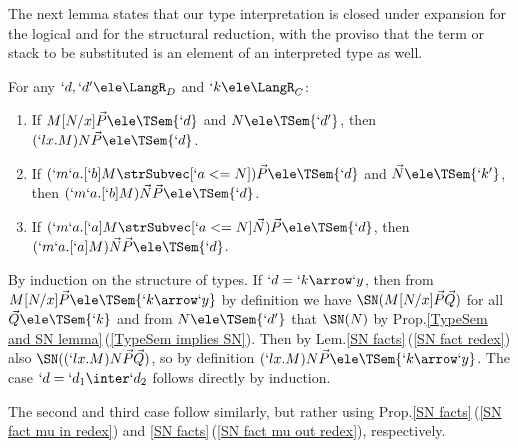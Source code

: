 \documentclass{lmcs}
\newcommand{\vect}[1]{\vec{#1}}
\begin{document}
The next lemma states that our type interpretation is closed under expansion for the logical and for the structural reduction, with the proviso that the term or stack to be substituted is an element of an interpreted type as well.

 \begin{lem} \label{Typesem expansion} 
For any $`d, `d' \ele\LangR_D$ and $`k \ele\LangR_C$:
 \begin{enumerate}

 \item \label{Typesem expansion logical}
If $ M[N/x]\vect{P} \ele \TSem{`d} $ and $ N \ele \TSem{`d'} $, then $ ( `lx.M)N\vect{P} \ele \TSem{`d}$.

 \item \label{Typesem expansion structural in}
If $ (`m`a.[`b]M \strSubvec [ `a <= N ] )\vect{P} \ele \TSem{`d} $ and $\vect{N} \ele \TSem{`k' }$, then $ (`m`a.[`b]M) \vect{N} \vect{P} \ele \TSem{`d} $.

 \item \label{Typesem expansion structural out}
If $ (`m`a.[`a]M \strSubvec [ `a <= N ] \vect{N}) \vect{P} \ele \TSem{`d} $, then $ (`m`a.[`a]M) \vect{N} \vect{P} \ele \TSem{`d} $.

 \end{enumerate}
 \end{lem}

 \begin{Proof} 

By induction on the structure of types.
If $`d = `k\arrow `y$, then from $M[N/x]\vect{P} \ele \TSem{`k\arrow `y}$ by definition we have $ \SN(M[N/x]\vect{P}\vect{Q})$ for all $\vect{Q} \ele \TSem{`k} $ and from $N \ele \TSem{`d'}$ that $\SN(N)$ by Prop.\skp\ref{TypeSem and SN lemma}\,(\ref{TypeSem implies SN}).
Then by Lem.\skp\ref {SN facts}\,(\ref{SN fact redex}) also $ \SN((`lx.M)N\vect{P}\vect{Q}) $, so by definition $(`lx.M)N\vect{P} \ele \TSem{`k\arrow `y}$.
The case $`d = `d_1\inter`d_2$ follows directly by induction.

The second and third case follow similarly, but rather using Prop.\skp\ref {SN facts}\,(\ref{SN fact mu in redex}) and \ref {SN facts}\,(\ref{SN fact mu out redex}), respectively.
 \end{Proof}
\end{document}
